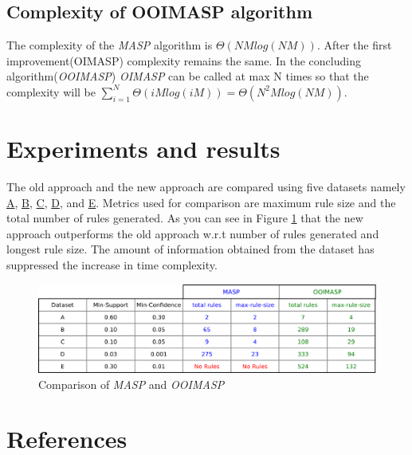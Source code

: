 \documentclass[review]{elsarticle}
\begin{document}
\subsection{Complexity of OOIMASP algorithm}
The complexity of the \emph{MASP} algorithm \cite{oldmasp} is $ \Theta(NMlog(NM)) $. After the first improvement(OIMASP) complexity remains the same. In the concluding algorithm(\emph{OOIMASP}) \emph{OIMASP} can be called at max N times so that the complexity will be $ \displaystyle\sum_{i=1}^{N} \Theta(iMlog(iM)) = \Theta(N^{2}Mlog(NM)) $.

\section{Experiments and results}
The old approach and the new approach are compared using five datasets namely \href{https://github.com/cryptomanic/MOIMASP-datasets/blob/master/A.csv}{A}, \href{https://github.com/cryptomanic/MOIMASP-datasets/blob/master/B.csv}{B}, \href{https://github.com/cryptomanic/MOIMASP-datasets/blob/master/C.csv}{C}, \href{https://github.com/cryptomanic/MOIMASP-datasets/blob/master/D.csv}{D}, and \href{https://github.com/cryptomanic/MOIMASP-datasets/blob/master/E.csv}{E}. Metrics used for comparison are maximum rule size and the total number of rules generated. As you can see in Figure \ref{Fig 11} that the new approach outperforms the old approach w.r.t number of rules generated and longest rule size. The amount of information obtained from the dataset has suppressed the increase in time complexity.

\begin{figure}
\begin{center}
\includegraphics[scale=0.30]{pdf/comparison}
\end{center}
\caption{Comparison of \emph{MASP} and \emph{OOIMASP}}
\label{Fig 11}
\end{figure}

\section*{References}


\end{document}
